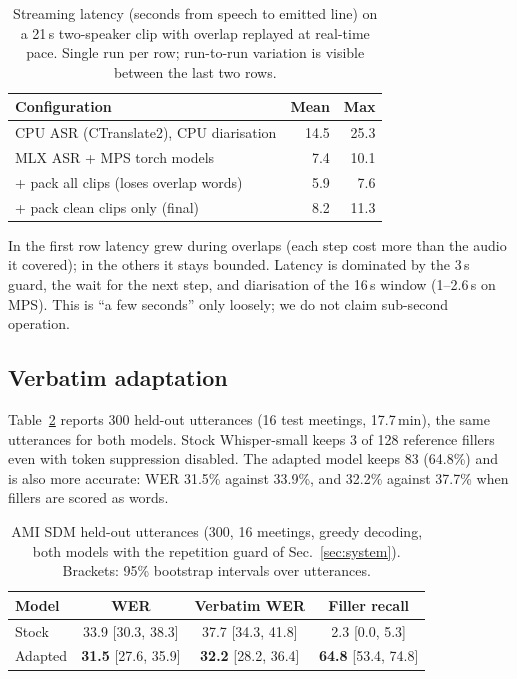 \documentclass[conference]{IEEEtran}
\begin{document}
\begin{table}[t]
\caption{Streaming latency (seconds from speech to emitted line) on a 21\,s two-speaker clip with overlap replayed at real-time pace. Single run per row; run-to-run variation is visible between the last two rows.}
\label{tab:latency}
\centering\footnotesize\setlength{\tabcolsep}{3.5pt}
\begin{tabular}{@{}lrr@{}}
\toprule
Configuration & Mean & Max \\
\midrule
CPU ASR (CTranslate2), CPU diarisation & 14.5 & 25.3 \\
MLX ASR + MPS torch models & 7.4 & 10.1 \\
\quad + pack all clips (loses overlap words) & 5.9 & 7.6 \\
\quad + pack clean clips only (final) & 8.2 & 11.3 \\
\bottomrule
\end{tabular}
\end{table}

In the first row latency grew during overlaps (each step cost more than the audio it covered); in the others it stays bounded. Latency is dominated by the 3\,s guard, the wait for the next step, and diarisation of the 16\,s window (1--2.6\,s on MPS). This is ``a few seconds'' only loosely; we do not claim sub-second operation.

\subsection{Verbatim adaptation}
Table~\ref{tab:ami} reports 300 held-out utterances (16 test meetings, 17.7\,min), the same utterances for both models. Stock Whisper-small keeps 3 of 128 reference fillers even with token suppression disabled. The adapted model keeps 83 (64.8\%) and is also more accurate: WER 31.5\% against 33.9\%, and 32.2\% against 37.7\% when fillers are scored as words.

\begin{table}[t]
\caption{AMI SDM held-out utterances (300, 16 meetings, greedy decoding, both models with the repetition guard of Sec.~\ref{sec:system}). Brackets: 95\% bootstrap intervals over utterances.}
\label{tab:ami}
\centering\footnotesize\setlength{\tabcolsep}{2.5pt}
\begin{tabular}{@{}lccc@{}}
\toprule
Model & WER & Verbatim WER & Filler recall \\
\midrule
Stock & 33.9 {\scriptsize[30.3, 38.3]} & 37.7 {\scriptsize[34.3, 41.8]} & 2.3 {\scriptsize[0.0, 5.3]} \\
Adapted & \textbf{31.5} {\scriptsize[27.6, 35.9]} & \textbf{32.2} {\scriptsize[28.2, 36.4]} & \textbf{64.8} {\scriptsize[53.4, 74.8]} \\
\bottomrule
\end{tabular}
\end{table}
\end{document}
